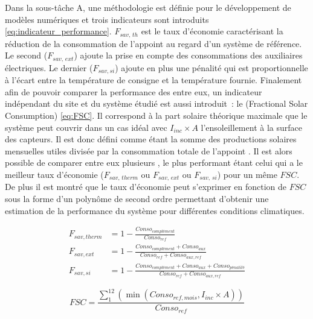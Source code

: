 Dans la sous-tâche A, une méthodologie est définie pour le développement de modèles
numériques et trois indicateurs sont introduits \eqref{eq:indicateur_performance}. $F_{sav,\,th}$ est le taux d’économie
caractérisant la réduction de la
consommation de l’appoint au regard d’un système de référence. Le second ($F_{sav,\,ext}$) ajoute
la prise en compte des consommations des auxiliaires électriques. Le dernier ($F_{sav, si}$) ajoute en
plus une pénalité qui est proportionnelle à l’écart entre la température de consigne et la température
fournie.
Finalement afin de pouvoir comparer la performance des  entre eux, un indicateur
indépendant du site et du système étudié est aussi introduit~: le  (Fractional Solar Consumption) \eqref{eq:FSC}.
Il correspond à la part solaire théorique maximale que le système peut couvrir dans un cas idéal avec $I_{inc} \times A$
l’ensoleillement à la surface des capteurs. Il est donc défini comme étant la somme des productions solaires mensuelles
utiles divisée par la consommation totale de l’appoint \parencite{Letz2009}. Il est alors possible
de comparer entre eux plusieurs , le plus performant étant celui qui a le meilleur taux d’économie
($F_{sav,\,therm}$ ou $F_{sav,\,ext}$ ou $F_{sav,\,si}$) pour un même $FSC$. De plus il est montré
que le taux d’économie peut s’exprimer en fonction de $FSC$ sous la forme d’un polynôme de second ordre
permettant d’obtenir une estimation de la performance du système pour différentes conditions climatiques.

\begin{subequations}\label{eq:indicateur_performance}
    \begin{align}
        F_{sav, therm} &= 1 - \frac{Conso_{complément}}{Conso_{ref}}                        \\
        F_{sav, ext}   &= 1 - \frac{Conso_{complément} + Conso_{aux}}{Conso_{ref} + Conso_{aux, ref}}  \\
        F_{sav, si}    &= 1 - \frac{Conso_{complément} + Conso_{aux} + Conso_{pénalité}}{Conso_{ref} + Conso_{aux, ref}}
    \end{align}
\end{subequations}

\begin{equation}\label{eq:FSC}
        FSC = \frac{\sum_{1}^{12} \left( \min(Conso_{ref, mois}, I_{inc} \times A) \right)}{Conso_{ref}}
\end{equation}

